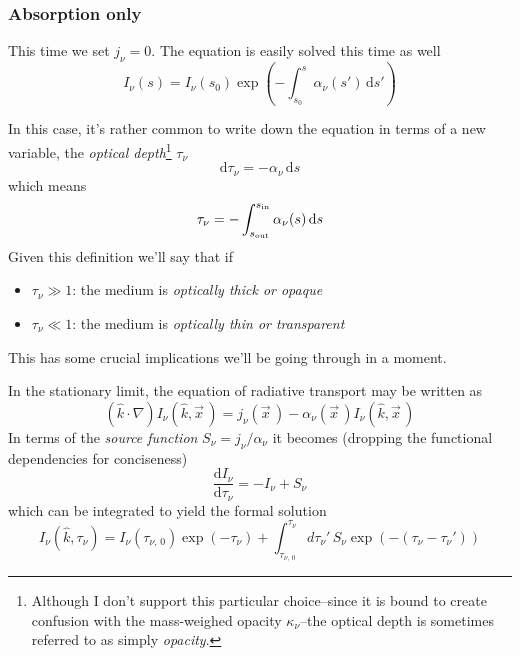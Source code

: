 \subsubsection*{Absorption only}

This time we set $j_{\nu} = 0$. The equation is easily solved this time as well 
\begin{equation*}
	I_{\nu}(s) = I_{\nu}(s_{0})\exp\left(-\int_{s_{0}}^{s} \alpha_{\nu}(s')\,\text{d}s'\right)
\end{equation*}
\par In this case, it's rather common to write down the equation in terms of a new variable, the \emph{optical depth}\footnote{Although I don't support this particular choice--since it is bound to create confusion with the mass-weighed opacity $\kappa_{\nu}$--the optical depth is sometimes referred to as simply \emph{opacity}.} $\tau_{\nu}$
\begin{equation}
	\text{d}\tau_{\nu} = -\alpha_{\nu}\,\text{d}s
\end{equation}
which means 
\begin{equation}
    \tau_{\nu} = -\int_{s_{\text{out}}}^{s_{\text{in}}} \alpha_{\nu}(s)\,\text{d}s
    \label{eq:opticaldepth}
\end{equation}
Given this definition we'll say that if
\begin{itemize}
	\item $\tau_{\nu} \gg 1$: the medium is \emph{optically thick or opaque}
	\item $\tau_{\nu} \ll 1$: the medium is \emph{optically thin or transparent}
\end{itemize}
This has some crucial implications we'll be going through in a moment.
\par In the stationary limit, the equation of radiative transport may be written as 
\begin{equation*}
	(\hat{k}\cdot \nabla)I_{\nu}(\hat{k}, \vec{x}\,) = j_{\nu}(\vec{x}\,)-\alpha_{\nu}(\vec{x}\,)I_{\nu}(\hat{k}, \vec{x}\,)
\end{equation*}
In terms of the \emph{source function} $S_{\nu} = j_{\nu}/\alpha_{\nu}$ it becomes (dropping the functional dependencies for conciseness)
\begin{equation}
	\frac{\text{d}I_{\nu}}{\text{d}\tau_{\nu}} = -I_{\nu}+S_{\nu}
\end{equation}
which can be integrated to yield the formal solution
\begin{equation}
    \boxed{
	    I_{\nu}(\hat{k}, \tau_{\nu}) = I_{\nu}(\tau_{\nu,\,0})\exp(-\tau_{\nu})+\int_{\tau_{\nu,\,0}}^{\tau_{\nu}} d\tau_{\nu}'\,S_{\nu}\exp(-(\tau_{\nu}-\tau_{\nu}'))
    }
    \label{eq:rt-general}
\end{equation}
